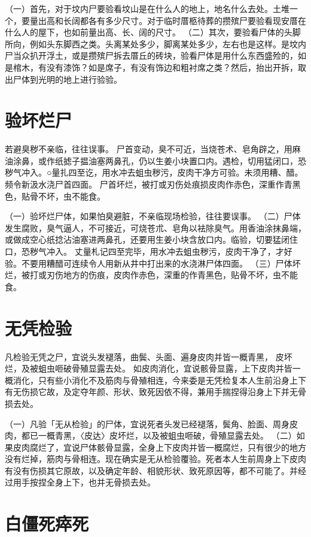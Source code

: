 \documentclass[12pt,UTF8]{ctexbook}
\begin{document}
（一）首先，对于坟内尸要验看坟山是在什么人的地上，地名什么去处。土堆一个，要量出高和长阔都各有多少尺寸。对于临时厝柩待葬的攒殡尸要验看现安厝在什么人的屋下，也如前量出高、长、阔的尺寸。
（二）其次，要验看尸体的头脚所向，例如头东脚西之类。头离某处多少，脚离某处多少，左右也是这样。是坟内尸当众扒开浮土，或是攒殡尸拆去厝丘的砖块，验看尸体是用什么东西盛殓的，如是棺木，有没有漆饰？如是席子，有没有饰边和粗衬席之类？然后，抬出开拆，取出尸体到光明的地上进行验验。


\chapter{验坏烂尸}

若避臭秽不亲临，往往误事。
尸首变动，臭不可近，当烧苍术、皂角辟之，用麻油涂鼻，或作纸摅子揾油塞两鼻孔，仍以生姜小块置口内。遇检，切用猛闭口，恐秽气冲入。○量扎四至讫，用水冲去蛆虫秽污，皮肉干净方可验。未须用糟、醋。频令新汲水浇尸首四面。
尸首坏烂，被打或刃伤处痕损皮肉作赤色，深重作青黑色，贴骨不坏，虫不能食。


（一）验坏烂尸体，如果怕臭避脏，不亲临现场检验，往往要误事。
（二）尸体发生腐败，臭气逼人，不可接近，可烧苍朮、皂角以袪除臭气。用香油涂抹鼻端，或做成空心纸捻沾油塞进两鼻孔，还要用生姜小块含放口内。临验，切要猛闭住口，恐秽气冲入。
丈量札记四至完毕，用水冲去蛆虫秽污，皮肉干净了，才好验。不要用糟醋可连续令人用新从井中打出来的水浇淋尸体四面。
（三）尸体坏烂，被打或刃伤地方的伤痕，皮肉作赤色，深重的作青黑色，贴骨不坏，虫不能食。


\chapter{无凭检验}

凡检验无凭之尸，宜说头发褪落，曲鬓、头面、遍身皮肉并皆一概青黑， 皮坏烂，及被蛆虫咂破骨殖显露去处。
如皮肉消化，宜说骸骨显露，上下皮肉并皆一概消化，只有些小消化不及筋肉与骨殖相连，今来委是无凭检复本人生前沿身上下有无伤损它故，及定夺年颜、形状、致死因依不得，兼用手揣捏得沿身上下并无骨损去处。


（一）凡验「无从检验」的尸体，宜说死者头发已经褪落，鬓角、脸面、周身皮肉，都已一概青黑，〈皮达〉皮坏烂，以及被蛆虫咂破，骨殖显露去处。
（二）如果皮肉腐烂了，宜说尸体骸骨显露，全身上下皮肉并皆一概腐烂，只有很少的地方没有烂掉，筋肉与骨相连。现在确实是无从检验覆验。死者本人生前周身上下皮肉有没有伤损其它原故，以及确定年龄、相貌形状、致死原因等，都不可能了。并经过用手按捏全身上下，也并无骨损去处。


\chapter{白僵死瘁死}
\end{document}
